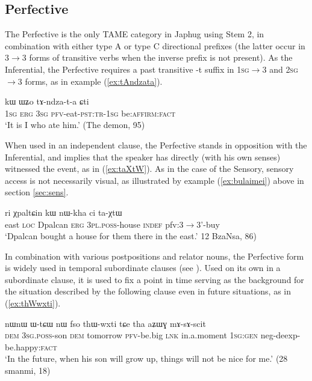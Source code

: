 \documentclass[oldfontcommands,oneside,a4paper,11pt]{article}
\newcommand{\ipa}[1]{{\phon \mbox{#1}}} %
\newcommand{\refb}[1]{(\ref{#1})}
\newcommand{\factual}[1]{\textsc{:fact}}
\begin{document}
\subsection{Perfective}  \label{sec:pfv}
The Perfective is the only TAME category in Japhug using Stem 2, in combination with either type A or type C directional prefixes (the latter occur in 3$\rightarrow$3 forms of transitive verbs when the inverse prefix is not present). As the Inferential, the Perfective requires a past transitive \ipa{-t} suffix in  \textsc{1sg}$\rightarrow$3 and \textsc{2sg}$\rightarrow$3 forms, as in example \refb{ex:tAndzata}.

\begin{exe}
\ex \label{ex:tAndzata}
\gll \ipa{aʑo} 	\ipa{kɯ} 	\ipa{ɯʑo} 	\ipa{tɤ-ndza-t-a} 	\ipa{ɕti} \\
\textsc{1sg} \textsc{erg} \textsc{3sg} \textsc{pfv}-eat-\textsc{pst:tr-1sg} be:\textsc{affirm:fact} \\
\glt `It is I who ate him.' (The demon, 95)
\end{exe}

When used in an independent clause,  the Perfective stands in opposition with the Inferential, and implies that the speaker has directly (with his own senses) witnessed the event, as in  \refb{ex:taXtW}. As in the case of the Sensory, sensory access is not necessarily visual, as illustrated by example \refb{ex:bulaimei} above in section \ref{sec:sens}.

\begin{exe}
\ex \label{ex:taXtW}
\gll \ipa{akɯ} 	\ipa{ri} 	\ipa{χpaltɕin} 	\ipa{kɯ} 	\ipa{nɯ-kha} 	\ipa{ci} 	\ipa{ta-χtɯ} \\
east \textsc{loc} Dpalcan \textsc{erg} \textsc{3pl.poss}-house \textsc{indef} pfv:3$\rightarrow$3'-buy \\
\glt `Dpalcan bought a house for them there in the east.' 12 BzaNsa, 86)
\end{exe}

In combination with various postpositions and relator nouns, the Perfective form is widely used in temporal subordinate clauses (see \citealt[284-93]{jacques14linking}). Used on its own in a subordinate clause, it is used to fix a point in time serving as the background for the situation described by the following clause even in future situations, as in \refb{ex:thWwxti}.

\begin{exe}
\ex \label{ex:thWwxti}
\gll 
\ipa{nɯnɯ} 	\ipa{ɯ-tɕɯ} 	\ipa{nɯ} 	\ipa{fso} 	\ipa{thɯ-wxti} 	\ipa{tɕe} 	\ipa{tha} 	\ipa{aʑɯɣ} 	\ipa{mɤ-sɤ-scit}  \\
\textsc{dem} \textsc{3sg.poss}-son \textsc{dem} tomorrow \textsc{pfv}-be.big \textsc{lnk} in.a.moment \textsc{1sg:gen} neg-deexp-be.happy\factual{} \\
\glt `In the future, when his son will grow up, things will not be nice for me.' (28 smanmi, 18)
\end{exe}
\end{document}
